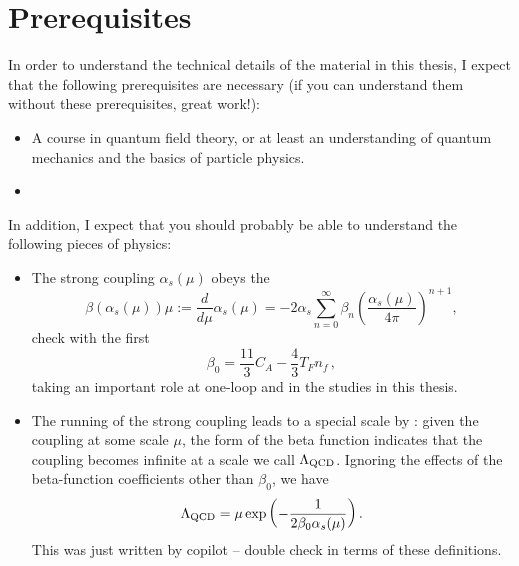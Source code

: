 \section*{Prerequisites}


In order to understand the technical details of the material in this thesis, I expect that the following prerequisites are necessary (if you can understand them without these prerequisites, great work!):
\begin{itemize}
    \item
        A course in quantum field theory, or at least an understanding of quantum mechanics and the basics of particle physics.

    \item

\end{itemize}

In addition, I expect that you should probably be able to understand the following pieces of physics:
\begin{itemize}
    \item
        The strong coupling \(\alpha_s(\mu)\) obeys the 
        \begin{equation}
        \beta(\alpha_s(\mu))\mu
        :=
        \frac{d}{d\mu} \alpha_s(\mu)
        =
        -2\alpha_s\sum_{n=0}^\infty \beta_n
        {\left(\frac{\alpha_s(\mu)}{4\pi}\right)}^{n+1},
        \end{equation}
        {check} with the first 
        \begin{equation}
            \beta_0
            =
            \frac{11}{3} C_A - \frac{4}{3} T_F n_f
            \,,
        \end{equation}
        taking an important role at one-loop and in the studies in this thesis.

    \item
        The running of the strong coupling leads to a special scale by :
        given the coupling at some scale \(\mu\), the form of the beta function indicates that the coupling becomes infinite at a scale we call \(\Lambda_{\mathrm{QCD}}\).
        Ignoring the effects of the beta-function coefficients other than \(\beta_0\), we have
        \begin{equation}
            \Lambda_{\mathrm{QCD}} = \mu \exp\left(-\frac{1}{2\beta_0 \alpha_s(\mu)}\right).
        \end{equation}
        {This was just written by copilot -- double check in terms of these definitions.}
\end{itemize}



